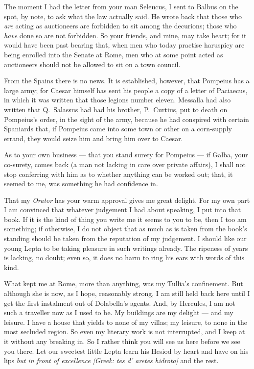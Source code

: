 

 The moment I had the letter from your man Seleucus, I sent to Balbus on the spot, by note, to ask what the law actually said. He wrote back that those who \textit{are} acting as auctioneers are forbidden to sit among the decurions; those who \textit{have} done so are not forbidden. So your friends, and mine, may take heart; for it would have been past bearing that, when men who today practise haruspicy are being enrolled into the Senate at Rome, men who at some point acted as auctioneers should not be allowed to sit on a town council.

 From the Spains there is no news. It is established, however, that Pompeius has a large army; for Caesar himself has sent his people a copy of a letter of Paciaecus, in which it was written that those legions number eleven. Messalla had also written that Q.~Salassus had had his brother, P.~Curtius, put to death on Pompeius's order, in the sight of the army, because he had conspired with certain Spaniards that, if Pompeius came into some town or other on a corn-supply errand, they would seize him and bring him over to Caesar.

 As to your own business --- that you stand surety for Pompeius --- if Galba, your co-surety, comes back (a man not lacking in care over private affairs), I shall not stop conferring with him as to whether anything can be worked out; that, it seemed to me, was something he had confidence in.

 That my \textit{Orator} has your warm approval gives me great delight. For my own part I am convinced that whatever judgement I had about speaking, I put into that book. If it is the kind of thing you write me it seems to you to be, then I too am something; if otherwise, I do not object that as much as is taken from the book's standing should be taken from the reputation of my judgement. I should like our young Lepta to be taking pleasure in such writings already. The ripeness of years is lacking, no doubt; even so, it does no harm to ring his ears with words of this kind.

 What kept me at Rome, more than anything, was my Tullia's confinement. But although she is now, as I hope, reasonably strong, I am still held back here until I get the first instalment out of Dolabella's agents. And, by Hercules, I am not such a traveller now as I used to be. My buildings are my delight --- and my leisure. I have a house that yields to none of my villas; my leisure, to none in the most secluded region. So even my literary work is not interrupted, and I keep at it without any breaking in. So I rather think you will see us here before we see you there. Let our sweetest little Lepta learn his Hesiod by heart and have on his lips \textit{but in front of excellence} \textit{[Greek: t\=es d' aret\=es hidr\=ota]} and the rest.
